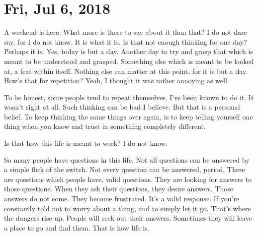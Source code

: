 \section{Fri, Jul 6, 2018}

A weekend is here. What more is there to say about it than that? I do not dare
say, for I do not know. It is what it is. Is that not enough thinking for one
day? Perhaps it is. Yes, today is but a day. Another day to try and grasp that
which is meant to be understood and grasped. Something else which is meant to be
looked at, a feat within itself. Nothing else can matter at this point, for it
is but a day. How's that for repetition? Yeah, I thought it was rather annoying
as well.

To be honest, some people tend to repeat themselves. I've been known to do it.
It wasn't right at all. Such thinking can be bad I believe. But that is a
personal belief. To keep thinking the same things over again, is to keep telling
yourself one thing when you know and trust in something completely different.

Is that how this life is meant to work? I do not know.

So many people have questions in this life. Not all questions can be answered by
a simple flick of the switch. Not every question can be answered, period. There
are questions which people have, valid questions. They are looking for answers
to those questions. When they ask their questions, they desire answers. Those
answers do not come. They become frustrated. It's a valid response. If you're
constantly told not to worry about a thing, and to simply let it go. That's
where the dangers rise up. People will seek out their answers. Sometimes they
will leave a place to go and find them. That is how life is.